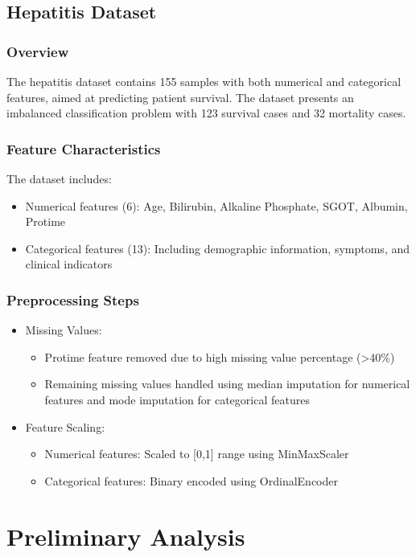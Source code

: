 \subsection{Hepatitis Dataset}
\subsubsection{Overview}
The hepatitis dataset contains 155 samples with both numerical and categorical features, aimed at predicting patient survival. The dataset presents an imbalanced classification problem with 123 survival cases and 32 mortality cases.

\subsubsection{Feature Characteristics}


The dataset includes:
\begin{itemize}
	\item Numerical features (6): Age, Bilirubin, Alkaline Phosphate, SGOT, Albumin, Protime
	\item Categorical features (13): Including demographic information, symptoms, and clinical indicators
\end{itemize}

\subsubsection{Preprocessing Steps}
\begin{itemize}
	\item Missing Values:
	\begin{itemize}
		\item Protime feature removed due to high missing value percentage (>40\%)
		\item Remaining missing values handled using median imputation for numerical features and mode imputation for categorical features
	\end{itemize}
	\item Feature Scaling:
	\begin{itemize}
		\item Numerical features: Scaled to [0,1] range using MinMaxScaler
		\item Categorical features: Binary encoded using OrdinalEncoder
	\end{itemize}
\end{itemize}

\section{Preliminary Analysis}
